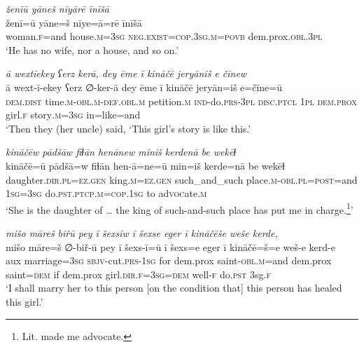 \ea \label{ZP.87}
\textit{ženīū yāneš nīyārē īnīšā} \\ 
\gll ženī=ū yāne=š nīye=ā=rē īnīšā \\ 
 woman\textsc{.f}=and house\textsc{.m}\textsc{=3sg} \textsc{\textsc{neg.}exist}\textsc{=cop}\textsc{.3sg}\textsc{.m}\textsc{=\textsc{povb}} dem.prox\textsc{.obl}\textsc{.3pl} \\ 
\glt `He has no wife, nor a house, and so on.'
\z 
 
\ea \label{ZP.88}
\textit{ā wextīekey ʕerz kerā, dey ēme ī kināčē jeryāniš e čīnew} \\ 
\gll ā wext-ī-ekey ʕerz ∅-ker-ā dey ēme ī kināčē jeryān=iš e=čīne=ū \\ 
 \textsc{dem.dist} time\textsc{.m}\textsc{-obl}\textsc{.m}\textsc{-def}\textsc{.obl}\textsc{.m} petition\textsc{.m} \textsc{ind-}do\textsc{.prs}\textsc{-3pl} \textsc{disc.ptcl} \textsc{1pl} \textsc{dem.prox} girl\textsc{.f} story\textsc{.m}\textsc{=3sg} in=like=and \\ 
\glt `Then they (her uncle) said, ‘This girl’s story is like this.'
\z 
 
\ea \label{ZP.89}
\textit{kināčēw pādšāw fiɫān henānew miniš kerdenā be wekēɫ} \\ 
\gll kināčē=ū pādšā=w fiɫān hen-ā=ne=ū min=iš kerde=nā be wekēɫ \\ 
 daughter\textsc{.dir}\textsc{.pl}\textsc{\textsc{=ez.gen}} king\textsc{.m}\textsc{\textsc{=ez.gen}} such\_and\_such place\textsc{.m}\textsc{-obl}\textsc{.pl}\textsc{=\textsc{post}}=and \textsc{1sg}\textsc{=3sg} do\textsc{.pst}\textsc{.ptcp}\textsc{.m}\textsc{=cop}\textsc{.\textsc{1sg}} to ad\textsc{voc}ate\textsc{.m} \\ 
\glt `She is the daughter of … the king of such-and-such place has put me in charge.\footnote{Lit. made me advocate.}'
\z 
 
\ea \label{ZP.90}
\textit{mišo māreš biřū pey ī šexsīw ī šexse eger ī kināčēše weše kerde,} \\ 
\gll mišo māre=š ∅-biř-ū pey ī šexs-ī=ū ī šexs=e eger ī kināčē=š=e weš-e kerd-e \\ 
 aux marriage\textsc{=3sg} \textsc{sbjv-}cut\textsc{.prs}\textsc{-\textsc{1sg}} for dem.prox saint\textsc{-obl}\textsc{.m}=and dem.prox saint\textsc{=dem} if dem.prox girl\textsc{.dir}\textsc{.f}\textsc{=3sg}\textsc{=dem} well\textsc{-f} do\textsc{.pst} 3sg\textsc{.f} \\ 
\glt `I shall marry her to this person [on the condition that] this person has healed this girl.'
\z 
 
